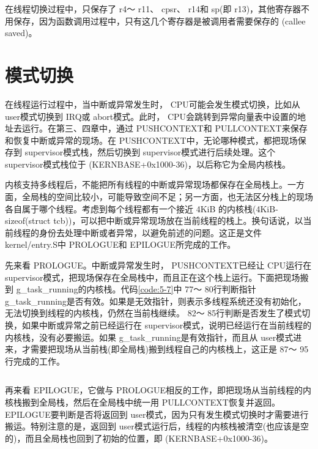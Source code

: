 \documentclass[main.tex]{subfiles}
\begin{document}
\begin{CJK*}{UTF8}{song}
\par
在线程切换过程中，只保存了 r4～ r11、 cpsr、 r14和 sp(即 r13)，其他寄存器不用保存，因为函数调用过程中，只有这几个寄存器是被调用者需要保存的 (callee saved)。

\section{模式切换}
在线程运行过程中，当中断或异常发生时， CPU可能会发生模式切换，比如从 user模式切换到 IRQ或 abort模式。此时， CPU会跳转到异常向量表中设置的地址去运行。在第三、四章中，通过 PUSH\-CONTEXT和  PULL\-CONTEXT来保存和恢复中断或异常的现场。在 PUSH\-CONTEXT中，无论哪种模式，都把现场保存到 supervisor模式栈，然后切换到 supervisor模式进行后续处理。这个 supervisor模式栈位于 (KERN\-BASE+0x1000-36)，以后称它为全局内核栈。

\par
内核支持多线程后，不能把所有线程的中断或异常现场都保存在全局栈上。一方面，全局栈的空间比较小，可能导致空间不足；另一方面，也无法区分栈上的现场各自属于哪个线程。考虑到每个线程都有一个接近 4\-KiB 的内核栈(4\-KiB-sizeof(struct tcb))，可以把中断或异常现场放在当前线程的栈上。换句话说，以当前线程的身份去处理中断或者异常，以避免前述的问题。这正是文件 kernel\-/\-entry.S中 PROLOGUE和 EPILOGUE所完成的工作。

\par
先来看 PROLOGUE。中断或异常发生时， PUSH\-CONTEXT已经让 CPU运行在 supervisor模式，把现场保存在全局栈中，而且正在这个栈上运行。下面把现场搬到  g\_\-task\_\-running的内核栈。代码\ref{code:5-7}中 77～ 80行判断指针   g\_\-task\_\-running是否有效。如果是无效指针，则表示多线程系统还没有初始化，无法切换到线程的内核栈，仍然在当前栈继续。 82～ 85行判断是否发生了模式切换，如果中断或异常之前已经运行在 supervisor模式，说明已经运行在当前线程的内核栈，没有必要搬运。如果  g\_\-task\_\-running是有效指针，而且从 user模式进来，才需要把现场从当前栈(即全局栈)搬到线程自己的内核栈上，这正是 87～ 95行完成的工作。

\begin{code}
\label{code:5-7}
\inputminted[firstline=76,lastline=97,linenos,numbersep=5pt,frame=lines,framesep=2mm]{gas}{src/chapter05/kernel/entry.S}
\end{code}

\par
再来看 EPILOGUE，它做与 PROLOGUE相反的工作，即把现场从当前线程的内核栈搬到全局栈，然后在全局栈中统一用 PULL\-CONTEXT恢复并返回。 EPILOGUE要判断是否将返回到 user模式，因为只有发生模式切换时才需要进行搬运。特别注意的是，返回到 user模式运行后，线程的内核栈被清空(也应该是空的)，而且全局栈也回到了初始的位置，即 (KERN\-BASE+0x1000-36)。


\end{CJK*}
\end{document}
